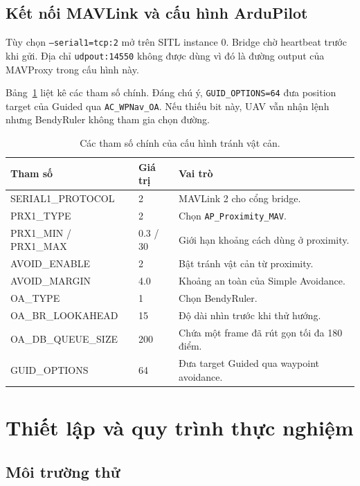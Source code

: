 \documentclass[11pt,a4paper]{article}
\begin{document}
\subsection{Kết nối MAVLink và cấu hình ArduPilot}

Tùy chọn \texttt{--serial1=tcp:2} mở  trên SITL instance 0. Bridge chờ heartbeat trước khi gửi. Địa chỉ \texttt{udpout:14550} không được dùng vì đó là đường output của MAVProxy trong cấu hình này.

Bảng~\ref{tab:params} liệt kê các tham số chính. Đáng chú ý, \texttt{GUID\_OPTIONS=64} đưa position target của Guided qua \texttt{AC\_WPNav\_OA}. Nếu thiếu bit này, UAV vẫn nhận lệnh nhưng BendyRuler không tham gia chọn đường.

\begin{table}[H]
\centering
\small
\renewcommand{\arraystretch}{1.15}
\begin{tabularx}{\textwidth}{@{}>{\ttfamily}p{38mm}p{18mm}>{\RaggedRight\arraybackslash}X@{}}
\toprule
\normalfont Tham số & Giá trị & Vai trò \\
\midrule
SERIAL1\_PROTOCOL & 2 & MAVLink 2 cho cổng bridge. \\
PRX1\_TYPE & 2 & Chọn \texttt{AP\_Proximity\_MAV}. \\
PRX1\_MIN / PRX1\_MAX & 0.3 / 30 & Giới hạn khoảng cách dùng ở proximity. \\
AVOID\_ENABLE & 2 & Bật tránh vật cản từ proximity. \\
AVOID\_MARGIN & 4.0 & Khoảng an toàn của Simple Avoidance. \\
OA\_TYPE & 1 & Chọn BendyRuler. \\
OA\_BR\_LOOKAHEAD & 15 & Độ dài nhìn trước khi thử hướng. \\
OA\_DB\_QUEUE\_SIZE & 200 & Chứa một frame đã rút gọn tối đa 180 điểm. \\
GUID\_OPTIONS & 64 & Đưa target Guided qua waypoint avoidance. \\
\bottomrule
\end{tabularx}
\caption{Các tham số chính của cấu hình tránh vật cản.}
\label{tab:params}
\end{table}

\section{Thiết lập và quy trình thực nghiệm}

\subsection{Môi trường thử}
\end{document}
